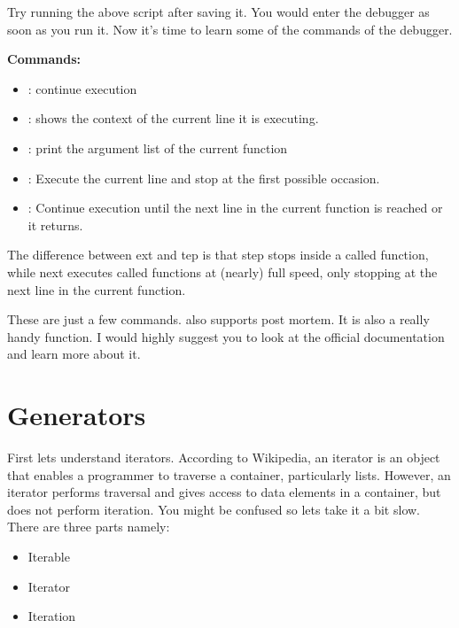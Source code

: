 \documentclass[a4paper,12pt,oneside]{sphinxmanual}
\begin{document}
Try running the above script after saving it. You would enter the
debugger as soon as you run it. Now it's time to learn some of the
commands of the debugger.

\textbf{Commands:}
\begin{itemize}
\item {} 
: continue execution

\item {} 
: shows the context of the current line it is executing.

\item {} 
: print the argument list of the current function

\item {} 
: Execute the current line and stop at the first possible
occasion.

\item {} 
: Continue execution until the next line in the current function
is reached or it returns.

\end{itemize}

The difference between ext and tep is that step stops
inside a called function, while next executes called functions at
(nearly) full speed, only stopping at the next line in the current
function.

These are just a few commands.  also supports post mortem. It is
also a really handy function. I would highly suggest you to look at the
official documentation and learn more about it.


\chapter{Generators}
\label{generators:generators}\label{generators::doc}
First lets understand iterators. According to Wikipedia, an iterator is
an object that enables a programmer to traverse a container,
particularly lists. However, an iterator performs traversal and gives
access to data elements in a container, but does not perform iteration.
You might be confused so lets take it a bit slow. There are three parts
namely:
\begin{itemize}
\item {} 
Iterable

\item {} 
Iterator

\item {} 
Iteration

\end{itemize}
\end{document}
